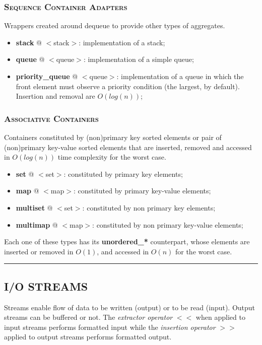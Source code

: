 \documentclass[10pt]{article}
\begin{document}
\begin{multicols*}{5}
{\subsubsection*{\textsc{Sequence Container Adapters}} 
\noindent
Wrappers created around dequeue to provide other types of aggregates.

\begin{itemize}[leftmargin=*,topsep=0.25pt]
  \setlength\itemsep{-1.8pt}
	\item \textbf{stack} @ $<$stack$>$: implementation of a stack;
	\item \textbf{queue} @ $<$queue$>$: implementation of a simple queue;
	\item \textbf{priority\_queue} @ $<$queue$>$: implementation of a queue in which the front element must observe a priority condition (the largest, by default). Insertion and removal are $O(log(n))$;
\end{itemize}
\noindent

\subsubsection*{\textsc{Associative Containers}} 
\noindent
Containers constituted by (non)primary key sorted elements or pair of (non)primary key-value sorted elements that are  inserted, removed and accessed in $O(log(n))$ time complexity for the worst case.

\begin{itemize}[leftmargin=*,topsep=0.25pt]
  \setlength\itemsep{-1.8pt}
	\item \textbf{set} @ $<$set$>$: constituted by primary key elements;
	\item \textbf{map} @ $<$map$>$: constituted by primary key-value elements;
	\item \textbf{multiset} @ $<$set$>$: constituted by non primary key elements;
	\item \textbf{multimap} @ $<$map$>$: constituted by non primary key-value elements;  
\end{itemize}
\noindent
Each one of these types has its \textbf{unordered\_*} counterpart, whose elements are inserted or removed in $O(1)$, and accessed in $O(n)$ for the worst case. 


}

\par\noindent\rule{155pt}{0.4pt}

{\color{Blue}
\subsection*{I/O STREAMS}	
\noindent
Streams enable flow of data to be written (output) or to be read (input). Output streams can be buffered or not.
The \emph{extractor operator} $<<$ when applied to input streams performs formatted input while the \emph{insertion operator} $>>$ applied to output streams performs formatted output. 

}
\end{multicols*}
\end{document}
